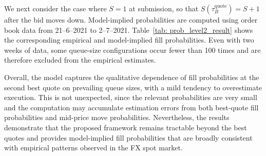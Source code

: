 \documentclass[11pt]{article}
\begin{document}
We next consider the case where $S=1$ at submission, so that $S(\tau_B^\text{quote})=S+1$ after the bid moves down. 
Model-implied probabilities are computed using order book data from 21--6--2021 to 2--7--2021. 
Table~\ref{tab: prob_level2_result} shows the corresponding empirical and model-implied fill probabilities. 
Even with two weeks of data, some queue-size configurations occur fewer than 100 times and are therefore excluded from the empirical estimates.

Overall, the model captures the qualitative dependence of fill probabilities at the second best quote on prevailing queue sizes, with a mild tendency to overestimate execution. 
This is not unexpected, since the relevant probabilities are very small and the computation may accumulate estimation errors from both best-quote fill probabilities and mid-price move probabilities. 
Nevertheless, the results demonstrate that the proposed framework remains tractable beyond the best quotes and provides model-implied fill probabilities that are broadly consistent with empirical patterns observed in the FX spot market.
\end{document}
